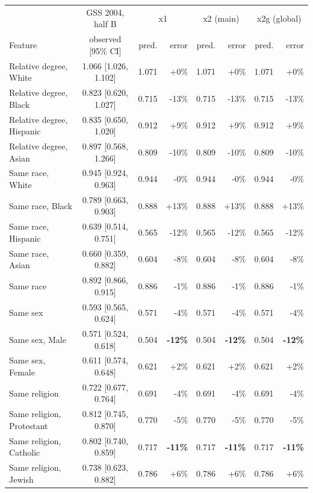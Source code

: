 \begin{tabular}{lcrrrrrr}
\hline
 & GSS 2004, half B & \multicolumn{2}{c}{x1} & \multicolumn{2}{c}{x2 (main)} & \multicolumn{2}{c}{x2g (global)} \\
Feature & observed [95\% CI] & pred. & error & pred. & error & pred. & error \\
\hline
Relative degree, White & 1.066 [1.026, 1.102] & 1.071 & +0\% & 1.071 & +0\% & 1.071 & +0\% \\
Relative degree, Black & 0.823 [0.620, 1.027] & 0.715 & -13\% & 0.715 & -13\% & 0.715 & -13\% \\
Relative degree, Hispanic & 0.835 [0.650, 1.020] & 0.912 & +9\% & 0.912 & +9\% & 0.912 & +9\% \\
Relative degree, Asian & 0.897 [0.568, 1.266] & 0.809 & -10\% & 0.809 & -10\% & 0.809 & -10\% \\
Same race, White & 0.945 [0.924, 0.963] & 0.944 & -0\% & 0.944 & -0\% & 0.944 & -0\% \\
Same race, Black & 0.789 [0.663, 0.903] & 0.888 & +13\% & 0.888 & +13\% & 0.888 & +13\% \\
Same race, Hispanic & 0.639 [0.514, 0.751] & 0.565 & -12\% & 0.565 & -12\% & 0.565 & -12\% \\
Same race, Asian & 0.660 [0.359, 0.882] & 0.604 & -8\% & 0.604 & -8\% & 0.604 & -8\% \\
Same race & 0.892 [0.866, 0.915] & 0.886 & -1\% & 0.886 & -1\% & 0.886 & -1\% \\
Same sex & 0.593 [0.565, 0.624] & 0.571 & -4\% & 0.571 & -4\% & 0.571 & -4\% \\
Same sex, Male & 0.571 [0.524, 0.618] & 0.504 & \textbf{-12\%} & 0.504 & \textbf{-12\%} & 0.504 & \textbf{-12\%} \\
Same sex, Female & 0.611 [0.574, 0.648] & 0.621 & +2\% & 0.621 & +2\% & 0.621 & +2\% \\
Same religion & 0.722 [0.677, 0.764] & 0.691 & -4\% & 0.691 & -4\% & 0.691 & -4\% \\
Same religion, Protestant & 0.812 [0.745, 0.870] & 0.770 & -5\% & 0.770 & -5\% & 0.770 & -5\% \\
Same religion, Catholic & 0.802 [0.740, 0.859] & 0.717 & \textbf{-11\%} & 0.717 & \textbf{-11\%} & 0.717 & \textbf{-11\%} \\
Same religion, Jewish & 0.738 [0.623, 0.882] & 0.786 & +6\% & 0.786 & +6\% & 0.786 & +6\% \\

\end{tabular}
